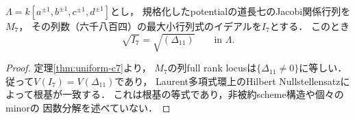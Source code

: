 \begin{corollary}[道長七の関係行列の根基]\label{cor:c7-radical}
$\Lambda=k[a^{\pm1},b^{\pm1},c^{\pm1},d^{\pm1}]$とし，
規格化したpotentialの道長七のJacobi関係行列を$M_7$，
その列数（六千八百四）の最大小行列式のイデアルを$I_7$とする．
このとき
\[
\sqrt{I_7}=\sqrt{(\Delta_{11})}\qquad\text{in }\Lambda .
\]
\end{corollary}
\begin{proof}
定理\ref{thm:uniform-c7}より，
$M_7$の列full rank locusは$\{\Delta_{11}\ne0\}$に等しい．
従って$V(I_7)=V(\Delta_{11})$であり，
Laurent多項式環上のHilbert Nullstellensatzによって根基が一致する．
これは根基の等式であり，非被約scheme構造や個々のminorの
因数分解を述べていない．
\end{proof}
